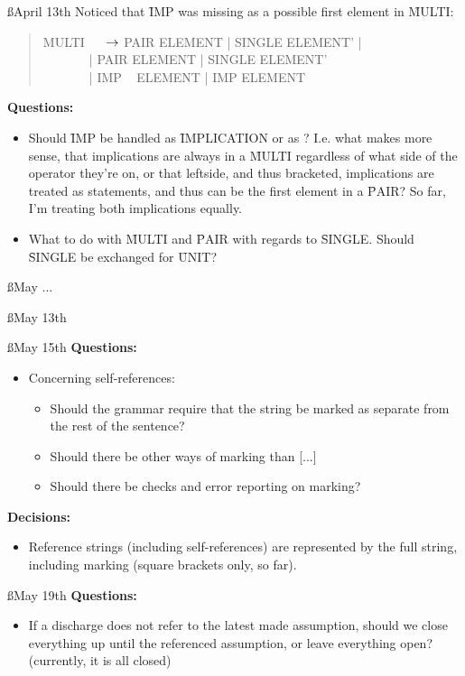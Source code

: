 \documentclass[a4paper]{article}
\begin{document}
\ss{April 13th}
Noticed that \f{IMP} was missing as a possible first element in \f{MULTI}:
\begin{quote}
\ttfamily
MULTI \(~~~~~~\)$\rightarrow$ PAIR \: ELEMENT |
                      SINGLE  ELEMENT' |\\
\(~~~~~~~~~~~~~~~\) | PAIR  ELEMENT  |
                      SINGLE  ELEMENT'\\
\(~~~~~~~~~~~~~~~\) | IMP ~ ELEMENT  |
                      IMP  ELEMENT\\
\end{quote}

{\bf Questions:}
\begin{itemize}
    \item Should \f{IMP} be handled as \f{IMPLICATION} or as ? I.e.
    what makes more sense, that implications are always in a \f{MULTI} 
    regardless of what side of the operator they're on, or that leftside,
    and thus bracketed, implications are treated as statements, and thus 
    can be the first element in a \f{PAIR}?
    So far, I'm treating both implications equally.

    \item What to do with \f{MULTI} and \f{PAIR} with regards to \f{SINGLE}.
    Should \f{SINGLE} be exchanged for \f{UNIT}?
\end{itemize}

\ss{May ...}

\ss{May 13th}

\ss{May 15th}
{\bf Questions:}
  \begin{itemize}
    \item Concerning self-references:
      \begin{itemize}
        \item Should the grammar require that the string be marked as 
        separate from the rest of the sentence?
        \item Should there be other ways of marking than [...]
        \item Should there be checks and error reporting on marking?
      \end{itemize}
  \end{itemize}

{\bf Decisions:}
  \begin{itemize}
    \item Reference strings (including self-references) are represented by 
    the full string, including marking (square brackets only, so far).
  \end{itemize}

\ss{May 19th}
{\bf Questions:}
  \begin{itemize}
    \item If a discharge does not refer to the latest made assumption, 
    should we close everything up until the referenced assumption, or
    leave everything open? (currently, it is all closed)
  \end{itemize}

\label{LastBody}
\end{document}
